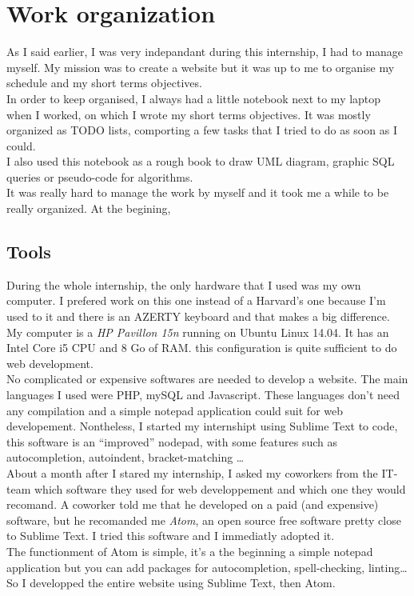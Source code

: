 \documentclass[10pt,a4paper]{article}
\begin{document}
\section{Work organization}
As I said earlier, I was very indepandant during this internship, I had to manage myself. My mission was to create a website but it was up to me to organise my schedule and my short terms objectives.\\
In order to keep organised, I always had a little notebook next to my laptop when I worked, on which I wrote my short terms objectives. It was mostly organized as TODO lists, comporting a few tasks that I tried to do as soon as I could.\\
I also used this notebook as a rough book to draw UML diagram, graphic SQL queries or pseudo-code for algorithms.\\

It was really hard to manage the work by myself and it took me a while to be really organized. At the begining, %

\subsection{Tools}

During the whole internship, the only hardware that I used was my own computer. I prefered work on this one instead of a Harvard's one because I'm used to it and there is an AZERTY keyboard and that makes a big difference.\\
My computer is a \textit{HP Pavillon 15n} running on Ubuntu Linux 14.04. It has an Intel Core i5 CPU and 8 Go of RAM\@. this configuration is quite sufficient to do web development.\\

No complicated or expensive softwares are needed to develop a website. The main languages I used were PHP, mySQL and Javascript. These languages don't need any compilation and a simple notepad application could suit for web developement. Nontheless, I started my internshipt using Sublime Text to code, this software is an ``improved'' nodepad, with some features such as autocompletion, autoindent, bracket-matching \ldots \\
About a month after I stared my internship, I asked my coworkers from the IT-team which software they used for web developpement and which one they would recomand. A coworker told me that he developed on a paid (and expensive) software, but he recomanded me \textit{Atom}, an open source free software pretty close to Sublime Text. I tried this software and I immediatly adopted it.\\
The functionment of Atom is simple, it's a the beginning a simple notepad application but you can add packages for autocompletion, spell-checking, linting\ldots \\
So I developped the entire website using Sublime Text, then Atom.
\end{document}
